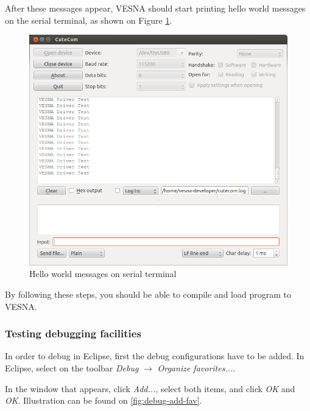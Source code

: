 \documentclass[a4paper, 10pt]{article}
\begin{document}
After these messages appear, VESNA should start printing hello world messages
on the serial terminal, as shown on Figure \ref{fig:hello-world}.

    \begin{figure}[H]
    \centering
        \includegraphics[width=\textwidth]{./install-guide-linux-images/hello-world-cutecom.png}
        \caption{Hello world messages on serial terminal}
        \label{fig:hello-world}
    \end{figure}


By following these steps, you should be able to compile and load program to VESNA.


\subsubsection{Testing debugging facilities}

In order to debug in Eclipse, first the debug configurations have to be added.
In Eclipse, select on the toolbar \emph{Debug} $\rightarrow$ \emph{Organize favorites...}.

In the window that appears, click \emph{Add...},
select both items, and click \emph{OK} and \emph{OK}. Illustration can be found on
\ref{fig:debug-add-fav}.
\end{document}
